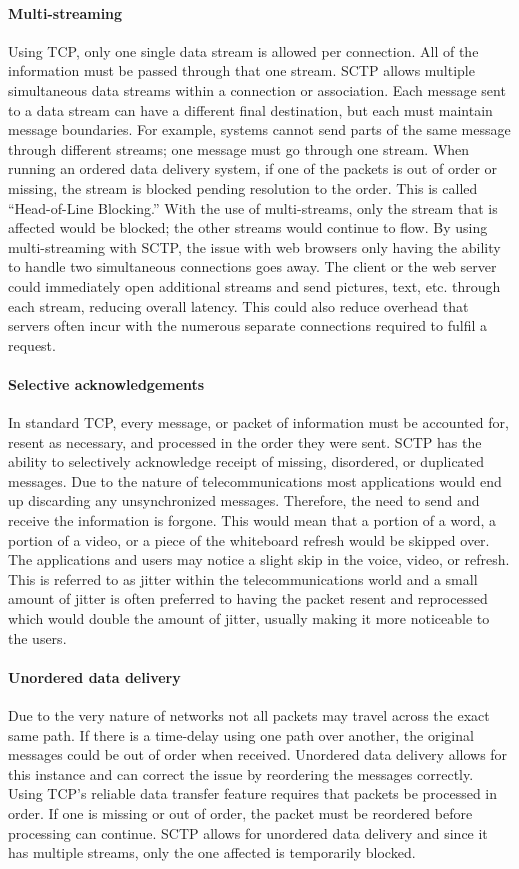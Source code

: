 \documentclass[a4paper]{article}
\begin{document}
\paragraph{Multi-streaming}
Using TCP, only one single data stream is allowed per connection. All of the information must be passed through that one stream. SCTP allows multiple simultaneous data streams within a connection or association. Each message sent to a data stream can have a different final destination, but each must maintain message boundaries. For example, systems cannot send parts of the same message through different streams; one message must go through one stream. When running an ordered data delivery system, if one of the packets is out of order or missing, the stream is blocked pending resolution to the order. This is called “Head-of-Line Blocking.” With the use of multi-streams, only the stream that is affected would be blocked; the other streams would continue to flow. By using multi-streaming with SCTP, the issue with web browsers only having the ability to handle two simultaneous connections goes away. The client or the web server could immediately open additional streams and send pictures, text, etc. through each stream, reducing overall latency. This could also reduce overhead that servers often incur with the numerous separate connections required to fulfil a request.

\paragraph{Selective acknowledgements}
In standard TCP, every message, or packet of information must be accounted for, resent as necessary, and processed in the order they were sent. SCTP has the ability to selectively acknowledge receipt of missing, disordered, or duplicated messages. Due to the nature of telecommunications most applications would end up discarding any unsynchronized messages. Therefore, the need to send and receive the information is forgone. This would mean that a portion of a word, a portion of a video, or a piece of the whiteboard refresh would be skipped over. The applications and users may notice a slight skip in the voice, video, or refresh. This is referred to as jitter within the telecommunications world and a small amount of jitter is often preferred to having the packet resent and reprocessed which would double the amount of jitter, usually making it more noticeable to the users.

\paragraph{Unordered data delivery}
Due to the very nature of networks not all packets may travel across the exact same path. If there is a time-delay using one path over another, the original messages could be out of order when received. Unordered data delivery allows for this instance and can correct the issue by reordering the messages correctly. Using TCP’s reliable data transfer feature requires that packets be processed in order. If one is missing or out of order, the packet must be reordered before processing can continue. SCTP allows for unordered data delivery and since it has multiple streams, only the one affected is temporarily blocked.
\end{document}
